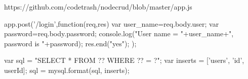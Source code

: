 https://github.com/codetrash/nodecrud/blob/master/app.js

app.post('/login',function(req,res){
  var user_name=req.body.user;
  var password=req.body.password;
  console.log("User name = "+user_name+", password is "+password);
  res.end("yes");
});


var sql = "SELECT * FROM ?? WHERE ?? = ?";
var inserts = ['users', 'id', userId];
sql = mysql.format(sql, inserts);